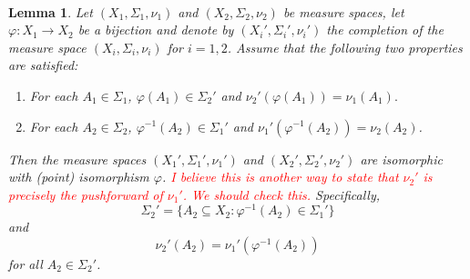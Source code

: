 \documentclass[11pt]{article}
\theoremstyle{theorem}
\newtheorem{lemma}[theorem]{Lemma}
\begin{document}
\
\begin{lemma}\label{lem:PushforwardLemma}
Let $(X_1,\Sigma_1,\nu_1)$ and $(X_2,\Sigma_2,\nu_2)$ be measure spaces, let $\varphi:X_1\to X_2$ be a bijection and denote by $(X_i',\Sigma_i',\nu_i')$ the completion of the measure space $(X_i,\Sigma_i,\nu_i)$ for $i=1,2$. Assume that the following two properties are satisfied:
\begin{enumerate}
\item\label{property:PushforwardLemma1} For each $A_1\in\Sigma_1$, $\varphi(A_1)\in\Sigma_2'$ and $\nu_2'(\varphi(A_1))=\nu_1(A_1).$
\item\label{property:PushforwardLemma2} For each $A_2\in\Sigma_2$, $\varphi^{-1}(A_2)\in \Sigma_1'$ and $\nu_1'(\varphi^{-1}(A_2))=\nu_2(A_2)$.
\end{enumerate}
Then the measure spaces $(X_1',\Sigma_1',\nu_1')$ and $(X_2',\Sigma_2',\nu_2')$ are isomorphic with (point) isomorphism $\varphi$. \textcolor{red}{I believe this is another way to state that $\nu_2'$ is precisely the pushforward of $\nu_1'$. We should check this.} Specifically,
\begin{equation}\label{eq:PushforwardLemma1}
\Sigma_2'=\{A_2\subseteq X_2: \varphi^{-1}(A_2)\in\Sigma_1'\}
\end{equation}
and
\begin{equation}\label{eq:PushforwardLemma2}
\nu_2'(A_2)=\nu_1'(\varphi^{-1}(A_2))
\end{equation}
for all $A_2\in\Sigma_2'$.
\end{lemma}
\end{document}
